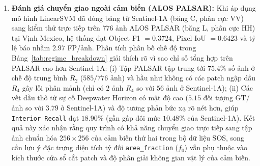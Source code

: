 \begin{enumerate}
    \item \textbf{Đánh giá chuyển giao ngoài cảm biến (ALOS PALSAR):} Khi áp dụng mô hình LinearSVM đã đóng băng từ Sentinel-1A (băng C, phân cực VV) sang kiểm thử trực tiếp trên 776 ảnh ALOS PALSAR (băng L, phân cực HH) tại Vịnh Mexico, hệ thống đạt Object F1 $= 0.3724$, Pixel IoU $= 0.6423$ và tỷ lệ báo nhầm $2.97$ FP/ảnh. Phân tích phân bố chế độ trong Bảng~\ref{tab:regime_breakdown} giải thích rõ vì sao chỉ số tổng hợp trên PALSAR cao hơn Sentinel-1A: (i) Tập PALSAR tập trung tới $75.4\%$ số ảnh ở chế độ trung bình $R_2$ ($585/776$ ảnh) và hầu như không có các patch ngập dầu $R_4$ gây lỗi phân mảnh (chỉ có $2$ ảnh $R_4$ so với $56$ ảnh ở Sentinel-1A); (ii) Các vết dầu thô từ sự cố Deepwater Horizon có mật độ cao ($5.15$ đối tượng GT/ảnh so với $3.79$ ở Sentinel-1A) và độ tương phản bức xạ rõ nét hơn, giúp \texttt{Interior Recall} đạt $18.90\%$ (gần gấp đôi mức $10.48\%$ của Sentinel-1A). Kết quả này xác nhận rằng quy trình có khả năng chuyển giao trực tiếp sang tập ảnh chuẩn hóa $256 \times 256$ của cảm biến thứ hai trong bộ dữ liệu SOS, song cần lưu ý đặc trưng diện tích tỷ đối \texttt{area\_fraction} ($f_0$) vẫn phụ thuộc vào kích thước cửa sổ cắt patch và độ phân giải không gian vật lý của cảm biến.
\end{enumerate}
